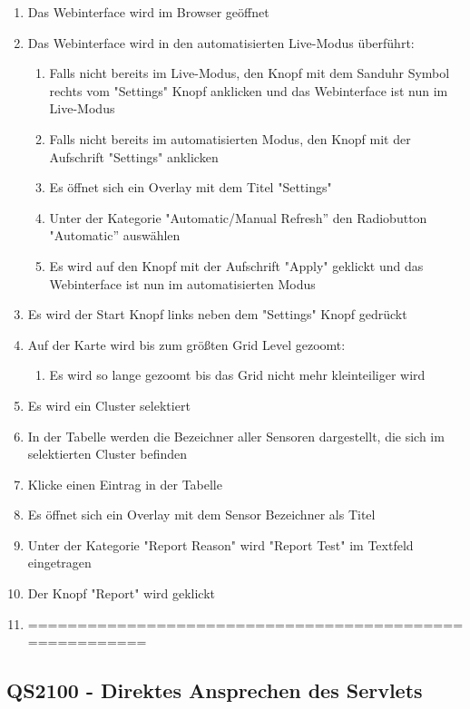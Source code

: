 \begin{enumerate}
\item Das Webinterface wird im Browser geöffnet
\item Das Webinterface wird in den automatisierten Live-Modus überführt:
\begin{enumerate}
\item Falls nicht bereits im Live-Modus, den Knopf mit dem Sanduhr Symbol rechts vom "Settings" Knopf anklicken und das Webinterface ist nun im Live-Modus
\item Falls nicht bereits im automatisierten Modus, den Knopf mit der Aufschrift "Settings" anklicken
\item Es öffnet sich ein Overlay mit dem Titel "Settings"
\item Unter der Kategorie "Automatic/Manual Refresh'' den Radiobutton "Automatic'' auswählen
\item Es wird auf den Knopf mit der Aufschrift "Apply" geklickt und das Webinterface ist nun im automatisierten Modus
\end{enumerate} 
\item Es wird der Start Knopf links neben dem "Settings" Knopf gedrückt
\item Auf der Karte wird bis zum größten Grid Level gezoomt:
\begin{enumerate}
\item Es wird so lange gezoomt bis das Grid nicht mehr kleinteiliger wird
\end{enumerate}
\item Es wird ein Cluster selektiert
\item In der Tabelle werden die Bezeichner aller Sensoren dargestellt, die sich im selektierten Cluster befinden
\item Klicke einen Eintrag in der Tabelle
\item Es öffnet sich ein Overlay mit dem Sensor Bezeichner als Titel
\item Unter der Kategorie "Report Reason" wird "Report Test" im Textfeld eingetragen
\item Der Knopf "Report" wird geklickt

\item ========================================================


\end{enumerate}
\szenarioOk

\subsection{QS2100 - Direktes Ansprechen des Servlets}
